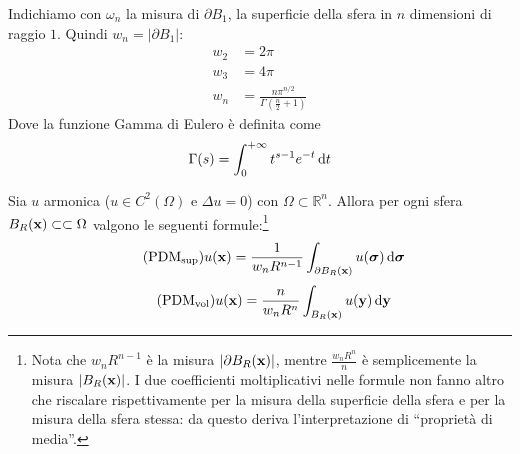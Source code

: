 Indichiamo con $\omega _{n}$ la misura di $\partial B_{1}$, la superficie della sfera in $n$ dimensioni di raggio $1$. Quindi $w_{n} =| \partial B_{1}| $:
\begin{align*}
    w_{2} & =2\pi                                                   \\
    w_{3} & =4\pi                                                   \\
    w_{n} & =\frac{n\pi ^{n/2}}{\Gamma \left(\frac{n}{2} +1\right)}
\end{align*}
Dove la funzione Gamma di Eulero è definita come
\begin{equation*}
    \Gamma (s) =\int ^{+\infty }_{0} t^{s-1} e^{-t} \,\mathrm d t
\end{equation*}
\begin{theorem}
    \label{thm:armonica-allora-pdm}
    Sia $u$ armonica ($u\in C^{2}(\Omega)$ e $\Delta u=0$) con $\Omega \subset \mathbb{R}^{n}$. Allora per ogni sfera $B_{R}(\mathbf{x}) \subset \subset \Omega $ valgono le seguenti formule:\footnote{Nota che $w_{n} R^{n-1}$ è la misura $| \partial B_{R}(\mathbf{x})| $, mentre $\frac{w_{n} R^{n}}{n}$ è semplicemente la misura $| B_{R}(\mathbf{x})| $. I due coefficienti moltiplicativi nelle formule non fanno altro che riscalare rispettivamente per la misura della superficie della sfera e per la misura della sfera stessa: da questo deriva l'interpretazione di ``proprietà di media''.}
    \begin{equation}
        \tag{PDM$_{\text{sup}}$}
        u(\x) =\frac{1}{w_{n} R^{n-1}}\int _{\partial B_{R}(\x)} u(\sigg) \dsig
        \label{eq:lap-prop-media-sup}
    \end{equation}
    \begin{equation}
        \tag{PDM$_{\text{vol}}$}
        u(\x) =\frac{n}{w_{n} R^{n}}\int _{B_{R}(\x)} u(\y) \dyy
        \label{eq:lap-prop-media-vol}
    \end{equation}
\end{theorem}
